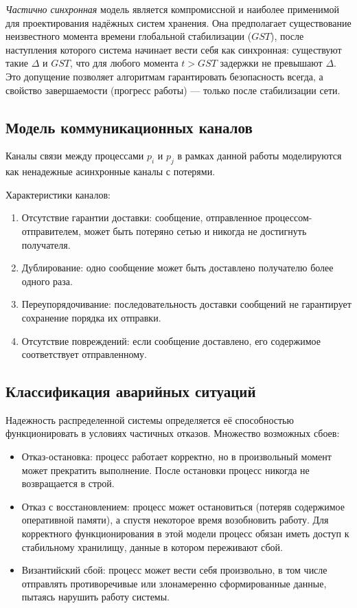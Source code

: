 \textit{Частично синхронная} модель является компромиссной и наиболее применимой для проектирования надёжных систем хранения. Она предполагает существование неизвестного момента времени глобальной стабилизации ($GST$), после наступления которого система начинает вести себя как синхронная: существуют такие $\Delta$ и $GST$, что для любого момента $t > GST$ задержки не превышают $\Delta$. Это допущение позволяет алгоритмам гарантировать безопасность всегда, а свойство завершаемости (прогресс работы) --- только после стабилизации сети.

\subsection{Модель коммуникационных каналов}

Каналы связи между процессами $p_i$ и $p_j$ в рамках данной работы моделируются как ненадежные асинхронные каналы с потерями.

Характеристики каналов:
\begin{enumerate}
    \item Отсутствие гарантии доставки: сообщение, отправленное процессом-отправителем, может быть потеряно сетью и никогда не достигнуть получателя.
    \item Дублирование: одно сообщение может быть доставлено получателю более одного раза.
    \item Переупорядочивание: последовательность доставки сообщений не гарантирует сохранение порядка их отправки.
    \item Отсутствие повреждений: если сообщение доставлено, его содержимое соответствует отправленному.
\end{enumerate}

\subsection{Классификация аварийных ситуаций}

Надежность распределенной системы определяется её способностью функционировать в условиях частичных отказов. Множество возможных сбоев:

\begin{itemize}
    \item Отказ-остановка: процесс работает корректно, но в произвольный момент может прекратить выполнение. После остановки процесс никогда не возвращается в строй.
    \item Отказ с восстановлением: процесс может остановиться (потеряв содержимое оперативной памяти), а спустя некоторое время возобновить работу. Для корректного функционирования в этой модели процесс обязан иметь доступ к стабильному хранилищу, данные в котором переживают сбой.
    \item Византийский сбой: процесс может вести себя произвольно, в том числе отправлять противоречивые или злонамеренно сформированные данные, пытаясь нарушить работу системы.
\end{itemize}

